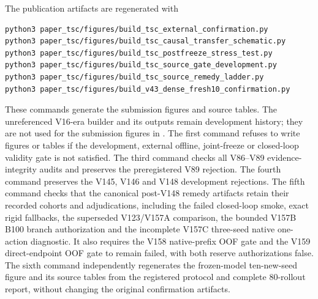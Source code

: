 The publication artifacts are regenerated with
\begin{verbatim}
python3 paper_tsc/figures/build_tsc_external_confirmation.py
python3 paper_tsc/figures/build_tsc_causal_transfer_schematic.py
python3 paper_tsc/figures/build_tsc_postfreeze_stress_test.py
python3 paper_tsc/figures/build_tsc_source_gate_development.py
python3 paper_tsc/figures/build_tsc_source_remedy_ladder.py
python3 paper_tsc/figures/build_v43_dense_fresh10_confirmation.py
\end{verbatim}
These commands generate the submission figures and source tables.  The
unreferenced V16-era builder and its outputs remain development history;
they are not used for the submission figures in
.
The first command refuses to write figures or tables if the development,
external offline, joint-freeze or closed-loop validity gate is not satisfied.
The third command checks all V86--V89 evidence-integrity audits and preserves
the preregistered V89 rejection.  The fourth command preserves the V145, V146
and V148 development rejections.  The fifth command checks that the canonical
post-V148 remedy artifacts retain
their recorded cohorts and adjudications, including the failed closed-loop
smoke, exact rigid fallbacks, the superseded V123/V157A comparison, the bounded
V157B B100 branch authorization and the incomplete V157C three-seed native
one-action diagnostic.  It also requires the V158 native-prefix OOF gate and
the V159 direct-endpoint OOF gate to remain failed, with both reserve
authorizations false.
The sixth command independently regenerates the frozen-model ten-new-seed
figure and its source tables from the registered protocol and complete
80-rollout report, without changing the original confirmation artifacts.
